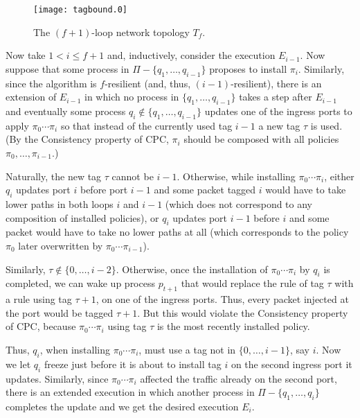 \documentclass[11pt,pdftex,letter]{article}
\begin{document}
\begin{appendix}
\begin{figure}[tbph]
  \centering
  \texttt{[image: tagbound.0]}
  \caption{The $(f+1)$-loop network topology $T_f$.}
  \label{fig:tagbound}
\end{figure}

Now take $1<i\leq f+1$ and,
inductively, consider the execution $E_{i-1}$.
Now suppose that some process in $\Pi-\{q_1,\ldots,q_{i-1}\}$  proposes to install
$\pi_i$.
Similarly, since the algorithm is $f$-resilient (and, thus,
$(i-1)$-resilient), there is an extension of $E_{i-1}$ in which no
process in $\{q_1,\ldots,q_{i-1}\}$ takes a step after $E_{i-1}$ and
eventually some process $q_i\notin \{q_1,\ldots,q_{i-1}\}$ updates one of the ingress ports to apply
$\pi_0\cdots\pi_i$ so that instead of the currently used tag $i-1$ a
new tag $\tau$ is used.
(By the Consistency property of CPC, $\pi_i$ should be composed with all policies $\pi_0,\ldots,\pi_{i-1}$.)

Naturally, the new tag $\tau$ cannot be $i-1$.
Otherwise, while installing $\pi_0\cdots\pi_i$,
either $q_i$ updates port $i$ before port $i-1$ and
some packet tagged $i$ would have to
take lower paths in both loops $i$ and $i-1$ (which does not
correspond to any composition of installed policies),
or $q_i$ updates port $i-1$ before $i$ and some packet would
have to take no lower paths at
all (which corresponds to
the policy $\pi_0$ later overwritten by $\pi_0\cdots\pi_{i-1}$).

Similarly, $\tau\notin\{0,\ldots,i-2\}$. Otherwise, once the installation
of $\pi_0\cdots\pi_i$ by $q_i$ is completed, we can wake up process
$p_{t+1}$ that would replace the rule of tag $\tau$ with a rule using
tag $\tau+1$, on one of the ingress ports. Thus, every packet injected at the
port would be tagged $\tau+1$. But this would violate the
Consistency property of CPC, because $\pi_0\cdots\pi_{i}$ using tag
$\tau$ is the most recently installed policy.

Thus, $q_i$, when installing $\pi_0\cdots\pi_{i}$, must use a tag not in $\{0,\ldots,i-1\}$,
say $i$. Now we let $q_i$ freeze just before it is about to install
tag $i$ on the second ingress port it updates.
Similarly, since $\pi_0\cdots\pi_i$ affected the traffic already on
the second port, there is an extended execution in which another
process in  $\Pi-\{q_1,\ldots,q_{i}\}$ completes the update and we get
the desired execution $E_i$.


\end{appendix}
\end{document}
